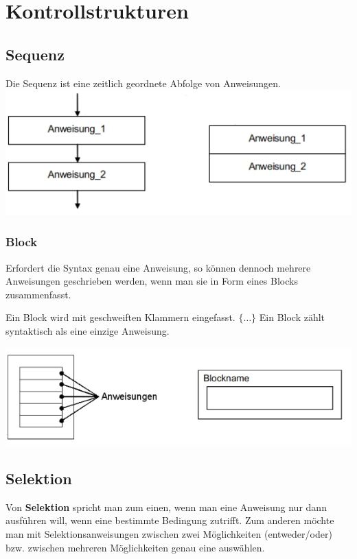 \section{Kontrollstrukturen}
	\begin{minipage}[t]{9 cm}
		\subsection{Sequenz }
			Die Sequenz ist eine zeitlich geordnete Abfolge von Anweisungen. \\
				\includegraphics[width=1\textwidth]{pics/Sequenz.jpg}	
			
	\end{minipage}
	\begin{minipage}[t]{9 cm}
			\subsubsection{Block}
				\begin{compactitem}
					\item Erfordert die Syntax genau eine Anweisung, so können dennoch mehrere Anweisungen geschrieben werden, wenn man sie in Form eines Blocks zusammenfasst.
					\item Ein Block wird mit geschweiften Klammern eingefasst. $\{ \dots \}$ Ein Block zählt syntaktisch als eine einzige Anweisung.
				\end{compactitem}
				\includegraphics[width=1\textwidth]{pics/Block.jpg}
	\end{minipage}	
		
	\subsection{Selektion }
		Von \textbf{Selektion} spricht man zum einen, wenn man eine Anweisung nur dann ausführen will, wenn eine bestimmte Bedingung zutrifft. Zum anderen möchte man mit Selektionsanweisungen zwischen zwei Möglichkeiten (entweder/oder) bzw. zwischen mehreren Möglichkeiten genau eine auswählen.\\
		
